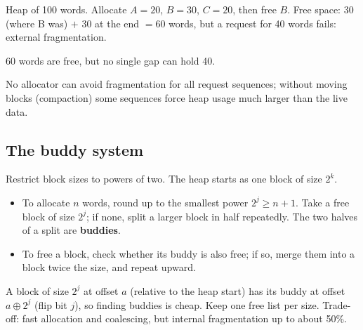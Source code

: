 \begin{example}
Heap of 100 words. Allocate $A=20$, $B=30$, $C=20$, then free $B$. Free space: 30 (where B was)
$+$ 30 at the end $=60$ words, but a request for 40 words fails: external fragmentation.
\end{example}
\begin{center}

\small 60 words are free, but no single gap can hold 40.
\end{center}

No allocator can avoid fragmentation for all request sequences; without moving blocks
(compaction) some sequences force heap usage much larger than the live data.

\subsection{The buddy system}
Restrict block sizes to powers of two. The heap starts as one block of size $2^k$.
\begin{itemize}
  \item To allocate $n$ words, round up to the smallest power $2^j \ge n+1$. Take a free block of
        size $2^j$; if none, split a larger block in half repeatedly. The two halves of a split
        are \textbf{buddies}.
  \item To free a block, check whether its buddy is also free; if so, merge them into a block
        twice the size, and repeat upward.
\end{itemize}
A block of size $2^j$ at offset $a$ (relative to the heap start) has its buddy at offset
$a \oplus 2^j$ (flip bit $j$), so finding buddies is cheap. Keep one free list per size.
Trade-off: fast allocation and coalescing, but internal fragmentation up to about 50\%.

